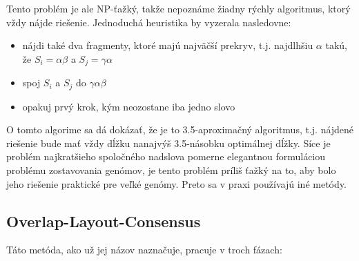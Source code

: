     Tento problém je ale NP-ťažký, takže nepoznáme žiadny rýchly algoritmus,
    ktorý vždy nájde riešenie. Jednoduchá heuristika by vyzerala nasledovne:
    
    \begin{itemize}
        \item nájdi také dva fragmenty, ktoré majú najväčší prekryv, t.j.
        najdlhšiu $\alpha$ takú, že $S_i = \alpha\beta$ a $S_j = \gamma\alpha$
        \item spoj $S_i$ a $S_j$ do $\gamma\alpha\beta$
        \item opakuj prvý krok, kým neozostane iba jedno slovo
    \end{itemize}
    
    O tomto algorime sa dá dokázať, že je to 3.5-aproximačný algoritmus, t.j.
    nájdené riešenie bude mať vždy dĺžku nanajvýš 3.5-násobku optimálnej dĺžky.
    Síce je problém najkratšieho spoločného nadslova pomerne elegantnou
    formuláciou problému zostavovania genómov, je tento problém príliš ťažký na
    to, aby bolo jeho riešenie praktické pre veľké genómy. Preto sa v praxi
    používajú iné metódy.

    \subsection{Overlap-Layout-Consensus}
    Táto metóda, ako už jej názov naznačuje, pracuje v troch fázach:
    
